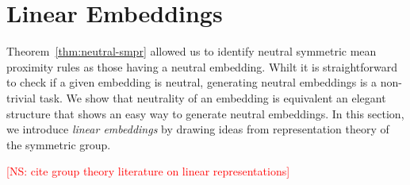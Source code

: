 \documentclass[10pt,letterpaper]{article}
\newcommand{\kibitz}[2]{\ifnum\Comments=1\textcolor{#1}{#2}\fi}
\newcommand{\cns}[1]{\kibitz{red} {[NS: #1]}}
\begin{document}



\section{Linear Embeddings}

Theorem~\ref{thm:neutral-smpr} allowed us to identify neutral symmetric mean proximity rules as those having a neutral embedding. Whilt it is straightforward to check if a given embedding is neutral, generating neutral embeddings is a non-trivial task. We show that neutrality of an embedding is equivalent an elegant structure that shows an easy way to generate neutral embeddings. In this section, we introduce \emph{linear embeddings} by drawing ideas from representation theory of the symmetric group. 

\cns{cite group theory literature on linear representations}

\end{document}
